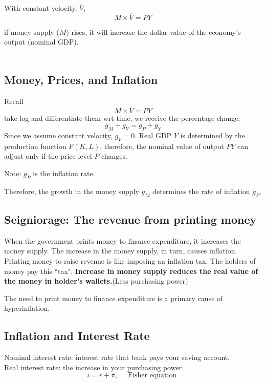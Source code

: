 \documentclass[12pt]{article}
\begin{document}
With constant velocity, $  \overline{V} $, 
\begin{equation*}
M  \times  \overline{V} = PY
\end{equation*}

if money supply ($ M $) rises, it will increase the dollar value of the economy's
output (nominal GDP).\\

\noindent{}\\


\subsection{Money, Prices, and Inflation}

Recall
\begin{equation*}
M  \times   \overline{V} = PY
\end{equation*}
take log and differentiate them wrt time, we receive the percentage change:
\begin{equation*}
g_{M} + g_{ \overline{V}} = g_{P} + g_{Y}
\end{equation*}
Since we assume constant velocity, $ g_{ \overline{V}} = 0 $.
Real GDP $ Y $ is determined by the production function $ F(K,L) $, therefore,
the nominal value of output $ PY $ can adjust only if the price level $ P $ changes.

Note: $ g_{P} $ is the inflation rate.

Therefore, the growth in the money supply $ g_{M} $ determines the rate of inflation
$ g_{P} $.


\subsection{Seigniorage: The revenue from printing money}
When the government prints money to finance expenditure, it increases the money supply.
The increase in the money supply, in turn, causes inflation. Printing money to raise 
revenue is like imposing an inflation tax. The holders of money pay this ``tax".
{\textbf {Increase in money supply reduces the real value of the money in holder's
wallets.}}(Less purchasing power)

The need to print money to finance expenditure is a primary cause of hyperinflation.


\subsection{Inflation and Interest Rate}
Nominal interest rate: interest rate that bank pays your saving account.\\
Real interest rate: the increase in your purchasing power.
\begin{equation*}
		i = r + \pi, \quad \text{ Fisher equation }
\end{equation*}
\end{document}
